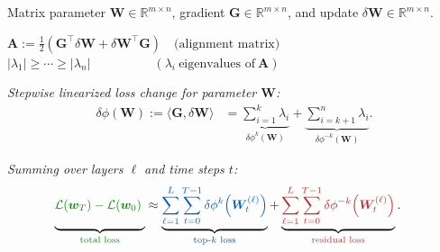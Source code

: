 \documentclass[border=6pt]{standalone}
\newcommand{\bA}{\boldsymbol{A}}
\newcommand{\bG}{\boldsymbol{G}}
\newcommand{\bW}{\boldsymbol{W}}
\newcommand{\bw}{\boldsymbol{w}}
\newcommand{\cL}{\mathcal{L}}
\newcommand{\R}{\mathbb{R}}
\newcommand{\tot}[1]{\textcolor{totcol}{#1}}
\newcommand{\topk}[1]{\textcolor{topcol}{#1}}
\newcommand{\res}[1]{\textcolor{rescol}{#1}}
\begin{document}
\begin{minipage}{0.92\linewidth}

\small
Matrix parameter $\bW \in \R^{m \times n}$, gradient $\bG \in \R^{m \times n}$, and update $\delta \bW \in \R^{m \times n}$.

\vspace{4pt}

\begin{tcolorbox}[
  colback=gray!10,
  colframe=gray!85,
  boxrule=0.8pt,
  arc=2pt,
  left=6pt,right=6pt,top=4pt,bottom=4pt
]
\centering
$\bA := \tfrac12\!\left(\bG^\top \delta \bW + \delta \bW^\top \bG\right)
\quad \text{(alignment matrix)}$\\[2pt]
{\small
\quad \quad $|\lambda_1| \ge \cdots \ge |\lambda_n|
\quad \quad \quad \quad \quad (\lambda_i\ \text{eigenvalues of}\ \bA)$
}
\end{tcolorbox}

\vspace{2pt}
\emph{Stepwise linearized loss change for parameter $\bW$:}
\vspace{-2pt}
\begin{align*}
\delta \phi(\bW) := \langle \bG, \delta \bW\rangle
&=
\underbrace{\sum_{i=1}^{k}\lambda_i}_{\delta \phi^{k}(\bW)}
+
\underbrace{\sum_{i=k+1}^{n}\lambda_i}_{\delta \phi^{-k}(\bW)} .
\end{align*}

\vspace{-4pt}
\emph{Summing over layers $\ell$ and time steps $t$:}
\vspace{-2pt}
\begin{align*}
\underbrace{\tot{\cL(\bw_T) - \cL(\bw_0)}\;\vphantom{\sum_{\ell=1}^{L}\sum_{t=0}^{T-1}}}_{\tot{\text{total loss}}}
&\approx
\underbrace{
\topk{\displaystyle
\sum_{\ell=1}^{L}\sum_{t=0}^{T-1}
\delta \phi^{k}\!\left(\bW_t^{(\ell)}\right)}
}_{\topk{\text{top-$k$ loss}}}
+
\underbrace{
\res{\displaystyle
\sum_{\ell=1}^{L}\sum_{t=0}^{T-1}
\delta \phi^{-k}\!\left(\bW_t^{(\ell)}\right)}
}_{\res{\text{residual loss}}}.
\end{align*}


\end{minipage}
\end{document}
